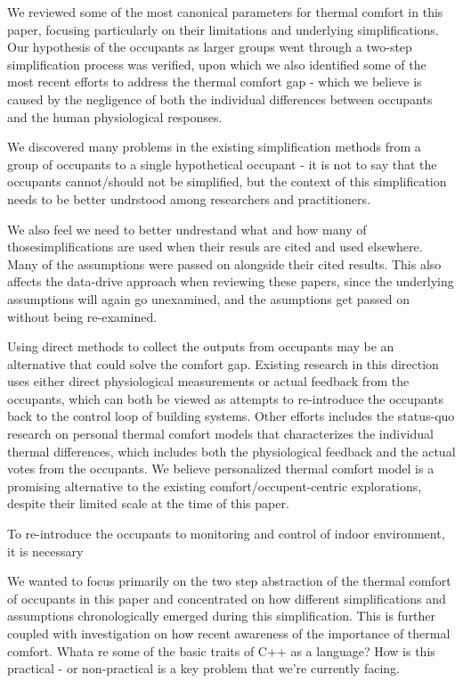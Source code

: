 We reviewed some of the most canonical parameters for thermal comfort in this paper, focusing particularly on their limitations and underlying simplifications. Our hypothesis of the occupants as larger groups went through a two-step simplification process was verified, upon which we also identified some of the most recent efforts to address the thermal comfort gap - which we believe is caused by the negligence of both the individual differences between occupants and the human physiological responses.

We discovered many problems in the existing simplification methods from a group of occupants to a single hypothetical occupant - it is not to say that the occupants cannot/should not be simplified, but the context of this simplification needs to be better undrstood among researchers and practitioners.

We also feel we need to better undrestand what and how many of thosesimplifications are used when their resuls are cited and used elsewhere. Many of the assumptions were passed on alongside their cited results. This also affects the data-drive approach when reviewing these papers, since the underlying assumptions will again go unexamined, and the asumptions get passed on without being re-examined.

Using direct methods to collect the outputs from occupants may be an alternative that could solve the comfort gap. Existing research in this direction uses either direct physiological measurements or actual feedback from the occupants, which can both be viewed as attempts to re-introduce the occupants back to the control loop of building systems. Other efforts includes the status-quo research on personal thermal comfort models that characterizes the individual thermal differences, which includes both the physiological feedback and the actual votes from the occupants. We believe personalized thermal comfort model is a promising alternative to the existing comfort/occupent-centric explorations, despite their limited scale at the time of this paper. 


To re-introduce the occupants to monitoring and control of indoor environment, it is necessary

We wanted to focus primarily on the two step abstraction of the thermal comfort of occupants in this paper and concentrated on how different simplifications and assumptions chronologically emerged during this simplification. This is further coupled with investigation on how recent awareness of the importance of thermal comfort. Whata re some of the basic traits of C++ as a language? How is this practical - or non-practical is a key problem that we're currently facing. 
